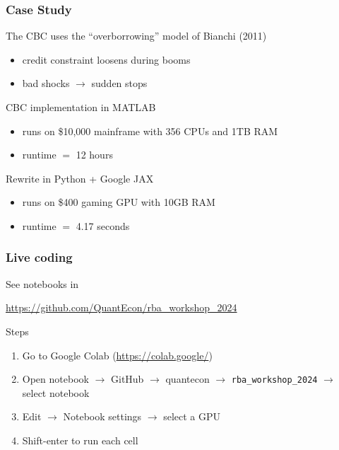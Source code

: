 \documentclass[
    xcolor={svgnames,dvipsnames},
    hyperref={colorlinks, citecolor=DeepPink4, linkcolor=DarkRed, urlcolor=DarkBlue}
    ]{beamer}  %
\newcommand{\1}{\mathbbm 1}
\begin{document}
\begin{frame}
    \frametitle{Case Study}

    The CBC uses the ``overborrowing'' model of Bianchi (2011)

    \begin{itemize}
        \item credit constraint loosens during booms
        \item bad shocks $\to$ sudden stops
    \end{itemize}

    \vspace{0.5em}
    CBC implementation in MATLAB 

    \begin{itemize}
        \item runs on \$10,000 mainframe with 356 CPUs and 1TB RAM
        \item runtime $=$ 12 hours
    \end{itemize}

    \pause
    \vspace{0.5em}
    Rewrite in Python + Google JAX

    \begin{itemize}
        \item runs on \$400 gaming GPU with 10GB RAM
        \item runtime $=$ 4.17 seconds
    \end{itemize}

\end{frame}


\begin{frame}
    \frametitle{Live coding}

    See notebooks in
    
    \begin{center}
        \url{https://github.com/QuantEcon/rba_workshop_2024}
    \end{center}

    \vspace{0.5em}
    Steps
    \begin{enumerate}
    \item Go to Google Colab (\url{https://colab.google/})
    \vspace{0.5em}
    \item Open notebook $\to$ GitHub $\to$ quantecon $\to$ \texttt{rba\_workshop\_2024}
        $\to$ select notebook
    \vspace{0.5em}
    \item Edit $\to$ Notebook settings $\to$ select a GPU
    \vspace{0.5em}
    \item Shift-enter to run each cell
    \end{enumerate}

\end{frame}
\end{document}
